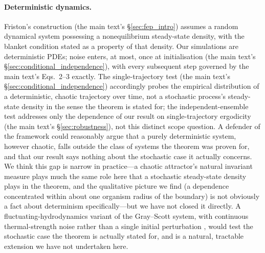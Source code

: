 \documentclass[11pt]{article}
\begin{document}
\paragraph{Deterministic dynamics.} Friston's construction (the main text's \S\ref{sec:fep_intro}) assumes a random dynamical system possessing a nonequilibrium steady-state density, with the blanket condition stated as a property of that density. Our simulations are deterministic PDEs; noise enters, at most, once at initialisation (the main text's \S\ref{sec:conditional_independence}), with every subsequent step governed by the main text's Eqs.~2--3 exactly. The single-trajectory test (the main text's \S\ref{sec:conditional_independence}) accordingly probes the empirical distribution of a deterministic, chaotic trajectory over time, not a stochastic process's steady-state density in the sense the theorem is stated for; the independent-ensemble test addresses only the dependence of our result on single-trajectory ergodicity (the main text's \S\ref{sec:robustness}), not this distinct scope question. A defender of the framework could reasonably argue that a purely deterministic system, however chaotic, falls outside the class of systems the theorem was proven for, and that our result says nothing about the stochastic case it actually concerns. We think this gap is narrow in practice---a chaotic attractor's natural invariant measure plays much the same role here that a stochastic steady-state density plays in the theorem, and the qualitative picture we find (a dependence concentrated within about one organism radius of the boundary) is not obviously a fact about determinism specifically---but we have not closed it directly. A fluctuating-hydrodynamics variant of the Gray--Scott system, with continuous thermal-strength noise rather than a single initial perturbation \citep{Kim2017,Kim2018}, would test the stochastic case the theorem is actually stated for, and is a natural, tractable extension we have not undertaken here.
\end{document}
